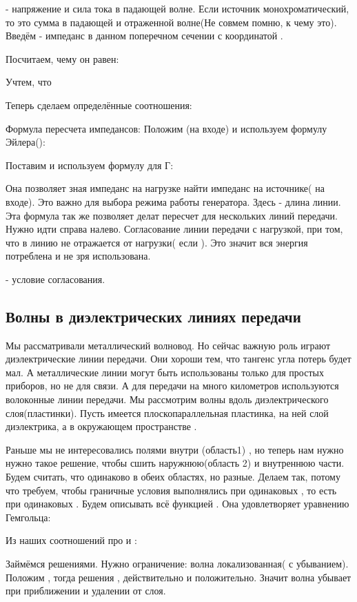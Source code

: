 - напряжение и сила тока в падающей волне.
%
Если источник монохроматический, то это сумма в падающей и отраженной волне(Не совмем помню, к чему это).
%
Введём
- импеданс в данном поперечном сечении с координатой . 

Посчитаем, чему он равен:

Учтем, что

Теперь сделаем определённые соотношения:

Формула пересчета импедансов:
%
Положим (на входе) и используем формулу Эйлера():

Поставим  и используем формулу для Г:

Она позволяет зная импеданс на нагрузке найти импеданс на источнике( на входе). Это важно для выбора режима работы генератора.
%
Здесь  - длина линии.
%
Эта формула так же позволяет делат пересчет для нескольких линий передачи.
%
Нужно идти справа налево.
%
Согласование линии передачи с нагрузкой, при том, что в линию не отражается от нагрузки( если ). Это значит вся энергия потреблена и не зря использована. 

- условие согласования.
%
\subsection{Волны в диэлектрических линиях передачи}
%
Мы рассматривали металлический волновод. Но сейчас важную роль играют диэлектрические линии передачи. Они хороши тем, что тангенс угла потерь будет мал. А металлические линии могут быть использованы только для простых приборов, но не для связи. А для передачи на много километров используются волоконные линии передачи. Мы рассмотрим волны вдоль диэлектрического слоя(пластинки). Пусть имеется плоскопараллельная пластинка, на ней слой диэлектрика, а в окружающем пространстве . 

Раньше мы не интересовались полями внутри (область1) , но теперь нам нужно нужно такое решение, чтобы сшить наружнюю(область 2) и внутреннюю части. Будем считать, что  одинаково в обеих областях, но разные. Делаем так, потому что требуем, чтобы граничные условия выполнялись при одинаковых , то есть при одинаковых . Будем описывать всё функцией . Она удовлетворяет уравнению Гемгольца:


Из наших соотношений про и :

Займёмся решениями. Нужно ограничение: волна локализованная( с убыванием). Положим , тогда решения ,  действительно и положительно.
%
Значит волна убывает при приближении и удалении от слоя.







